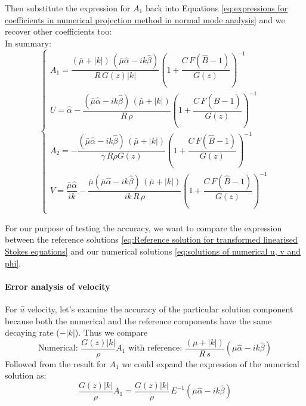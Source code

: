 Then substitute the expression for $A_1$ back into Equations \eqref{eq:expressions for coefficients in numerical projection method in normal mode analysis} and we recover other coefficients too:\\
In summary:
\begin{equation}\label{eq:solutions of coefficients in numerical projection method in normal mode analysis}
\begin{cases}
A_1 = \dfrac{(\bar{\mu} + |k|)\,(\bar{\mu} \hat{\alpha} - ik \hat{\beta})}{R \, G(z) |k|}(1 + \dfrac{C \, F(\hat{B} - 1)}{G(z)})^{-1}\\
U = \hat{\alpha} - \dfrac{(\bar{\mu} \hat{\alpha} - ik \hat{\beta}) \, (\bar{\mu} + |k|)}{R \, \rho} (1 + \dfrac{C\,F(\hat{B} - 1)}{G(z)})^{-1}\\
A_2 = - \dfrac{(\bar{\mu} \hat{\alpha} - ik \hat{\beta}) \, (\bar{\mu} + |k|)}{\gamma \, R \rho G(z)}(1 + \dfrac{C\,F(\hat{B} - 1)}{G(z)})^{-1}\\
V = \dfrac{\bar{\mu} \hat{\alpha}}{i k} - \dfrac{\bar{\mu}(\bar{\mu} \hat{\alpha} - ik \hat{\beta}) \, (\bar{\mu} + |k|)}{ik \, R \, \rho} (1 + \dfrac{C\,F(\hat{B} - 1)}{G(z)})^{-1}\\
\end{cases}
\end{equation}

For our purpose of testing the accuracy, we want to compare the expression between the reference solutions \eqref{eq:Reference solution for transformed linearised Stokes equations} and our numerical solutions \eqref{eq:solutions of numerical u, v and phi}.\\

\paragraph*{Error analysis of velocity} 
For $\hat{u}$ velocity, let's examine the accuracy of the particular solution component because both the numerical and the reference components have the same decaying rate ($- |k|$). Thus we compare
\begin{equation*}
\text{Numerical: }\dfrac{G(z) |k|}{\rho} A_1 \text{   with   reference: }\dfrac{(\mu + |k|)}{R \, s} (\mu \hat{\alpha} - ik \hat{\beta})
\end{equation*}
Followed from the result for $A_1$ we could expand the expression of the numerical solution as:
\begin{equation*}
\dfrac{G(z) |k|}{\rho} A_1 = \dfrac{G(z) |k|}{\rho} \, E^{-1} (\bar{\mu} \hat{\alpha} - ik \hat{\beta})
\end{equation*}

